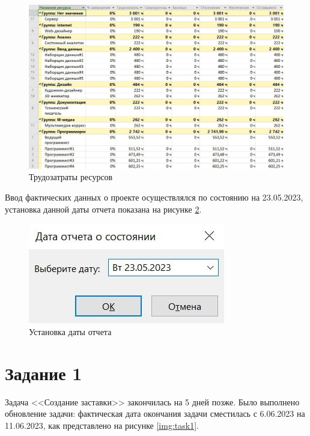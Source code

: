 \begin{figure}[H]
	\begin{center}
		\includegraphics[scale=0.3]{inc/img/start-lcosts.jpg}
	\end{center}
	\captionsetup{justification=centering}
	\caption{Трудозатраты ресурсов}
	\label{img:start-lcosts}
\end{figure}

Ввод фактических данных о проекте осуществлялся по состоянию на 23.05.2023, установка данной даты отчета показана на рисунке \ref{img:setup-data}.

\begin{figure}[H]
	\begin{center}
		\includegraphics[scale=0.5]{inc/img/setup-data.jpg}
	\end{center}
	\captionsetup{justification=centering}
	\caption{Установка даты отчета}
	\label{img:setup-data}
\end{figure}

\section*{Задание 1}

Задача <<Создание заставки>> закончилась на 5 дней позже. Было выполнено обновление задачи: фактическая дата окончания задачи сместилась с 6.06.2023 на 11.06.2023, как представлено на рисунке \ref{img:task1}.

